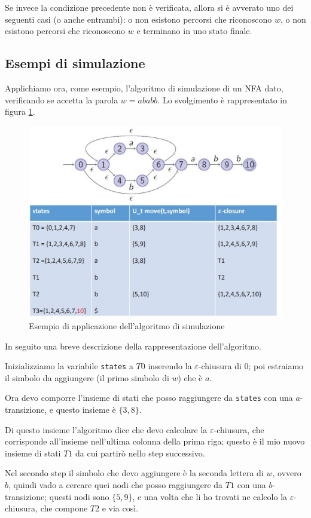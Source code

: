 \documentclass[class=book, crop=false, oneside, 12pt]{standalone}
\begin{document}
Se invece la condizione precedente non è verificata, allora si è avverato uno dei seguenti casi (o anche entrambi): o non esistono percorsi che riconoscono \(w\), o non esistono percorsi che riconoscono \(w\) e terminano in uno stato finale.

\subsection{Esempi di simulazione}
Applichiamo ora, come esempio, l'algoritmo di simulazione di un NFA dato, verificando se accetta la parola \(w  = ababb\). Lo svolgimento è rappresentato in figura \ref{simulazione_es_1}.

\begin{figure}
    \centering
    \includegraphics[width=.6\textwidth,keepaspectratio]{simulazione_es_1}
    \caption{Esempio di applicazione dell'algoritmo di simulazione}
    \label{simulazione_es_1}
\end{figure}

\noindent In seguito una breve descrizione della rappresentazione dell'algoritmo.

Inizializziamo la variabile \texttt{states} a \(T0\) inserendo la \(\varepsilon\)-chiusura di \(0\); poi estraiamo il simbolo da aggiungere (il primo simbolo di \(w\)) che è \(a\).

Ora devo comporre l’insieme di stati che posso raggiungere da \texttt{states} con una \(a\)-transizione, e questo insieme è \(\{3, 8\}\). 

Di questo insieme l’algoritmo dice che devo calcolare la \(\varepsilon\)-chiusura, che corrisponde all’insieme nell’ultima colonna della prima riga; questo è il mio nuovo insieme di stati \(T1\) da cui partirò nello step successivo.

Nel secondo step il simbolo che devo aggiungere è la seconda lettera di \(w\), ovvero \(b\), quindi vado a cercare quei nodi che posso raggiungere da \(T1\) con una \(b\)-transizione; questi nodi sono \(\{5,9\}\), e una volta che li ho trovati ne calcolo la \(\varepsilon\)-chiusura, che compone \(T2\) e via così.
\end{document}
